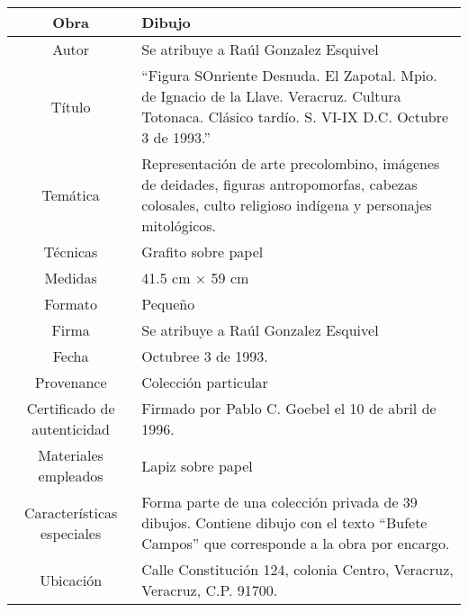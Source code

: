 \begin{table}[H]
\centering
\begin{tabular}{|c|m{}|}
\hline
Obra& Dibujo	\\
\hline
Autor & Se atribuye a Ra\'ul Gonzalez Esquivel\\
\hline
T\'itulo & ``Figura SOnriente Desnuda. El Zapotal. Mpio. de Ignacio de la Llave. Veracruz. Cultura Totonaca. Cl\'asico tard\'io. S. VI-IX D.C. Octubre 3 de 1993.''\\
\hline
Tem\'atica & Representaci\'on de arte precolombino, im\'agenes de deidades, figuras antropomorfas, cabezas colosales, culto religioso ind\'igena y personajes mitol\'ogicos.\\
\hline
T\'ecnicas &Grafito sobre papel \\
\hline
Medidas & 41.5 cm $\times$ 59 cm \\
\hline
 Formato & Peque\~no \\
 \hline
 Firma & Se atribuye a Ra\'ul Gonzalez Esquivel\\ 
 \hline
  Fecha & Octubree 3 de 1993.\\
 \hline
 Provenance & Colecci\'on particular\\
 \hline
 Certificado de autenticidad& Firmado por Pablo C. Goebel el 10 de abril de 1996.  \\
 \hline 
  Materiales empleados & Lapiz sobre papel\\
 \hline
 Caracter\'isticas especiales & Forma parte de una colecci\'on privada de 39 dibujos. 
Contiene dibujo con el texto ``Bufete Campos'' que corresponde a la obra por encargo. \\
\hline 
Ubicaci\'on & Calle Constituci\'on 124, colonia Centro, Veracruz, Veracruz, C.P. 91700.\\
\hline

\end{tabular}
\end{table}

